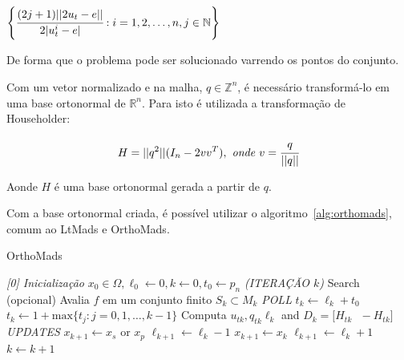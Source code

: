 \begin{center}
$ \left \{ \cfrac{(2j+1)||2u_t - e||}{2|u^i_t - e|} : i = 1,2,\dots,n,j \in \mathbb{N} \right \}$
\end{center}
De forma que o problema pode ser solucionado varrendo os pontos do conjunto.

Com um vetor normalizado e na malha, $q \in \mathbb{Z}^n$, é necessário transformá-lo em uma base ortonormal de $\mathbb{R}^n$. Para isto é utilizada a transformação de Householder:

\begin{equation}
H = ||q^2||(I_n - 2vv^T),\textit{ onde }v = \cfrac{q}{||q||}
\end{equation}

Aonde $H$ é uma base ortonormal gerada a partir de $q$.

Com a base ortonormal criada, é possível utilizar o algoritmo~\ref{alg:orthomads}, comum ao LtMads e OrthoMads.


\begin{algorithm}
    \caption{OrthoMads}
    \label{alg:orthomads}
    \begin{algorithmic}[1] %
\BState \emph{[0] Inicialização}   
                \State $x_0 \in \Omega , \ell_0 \gets 0, k \gets 0, t_0 \gets p_n$ 
\BState \emph{(ITERAÇÃO $k$)}                
            \State Search (opcional)
			\State Avalia $ f $ em um conjunto finito $S_k \subset M_k $
\State \emph{POLL}
    \State $t_k \gets \ell_k + t_0$
    \State $t_k \gets 1 + \text{max} \{t_j:j=0,1,\dots,k-1\}$
    \EndIf
    \State Computa $ u_{tk} , q_{tk}   \ell_k $ and $ D_k = \big[ H_{tk} \text{    } -H_{tk} \big] $
\BState \emph{UPDATES}                
		\State $x_{k+1} \gets x_s $ or $x_p$
		\State $\ell_{k+1} \gets \ell_k - 1$
		\State $x_{k+1} \gets x_k$
		\State $\ell_{k+1} \gets \ell_k + 1$
    \EndIf
    \State $k \gets k + 1$
    \EndWhile
    \end{algorithmic}
\end{algorithm}



